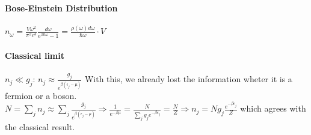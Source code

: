 \paragraph{Bose-Einstein Distribution}
$n_\omega = \frac{V \omega^2}{\pi^2 c^3} \frac{d \omega}{e^{\beta \hbar \omega} -1}
= \frac{\rho(\omega) d \omega}{\hbar \omega} \cdot V$

\paragraph{Classical limit}
$n_j \ll g_j$: $n_j \approx \frac{g_j}{e^{\beta (\epsilon_j - \mu)}}$
With this, we already lost the information wheter it is a fermion or a boson.
$N = \sum_j n_j \approx \sum_j \frac{g_j}{e^{\beta(\epsilon_j - \mu)}} \Rightarrow
\frac{1}{e^{-\beta \mu}} = \frac{N}{\sum_j g_j e^{-\beta \epsilon_j}} = \frac{N}{Z}
\Rightarrow n_j = N g_j \frac{e^{-\beta \epsilon_j}}{Z}$ which agrees with the
classical result.



